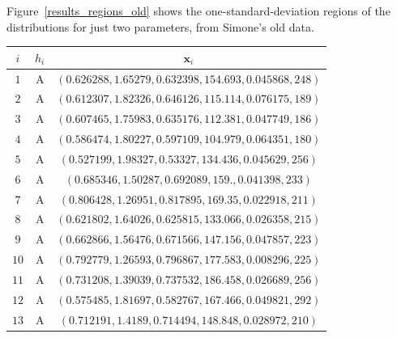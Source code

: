 \documentclass[\ifafour a4paper,12pt,\else a5paper,10pt,\fi%
onecolumn,oneside,article,%
british%
]{memoir}
\theoremstyle{remark}
\theoremstyle{innote}
\renewcommand*{\|}{\mathpunct{|}}
\newcommand*{\yH}{h}
\newcommand*{\yx}{x}
\newcommand*{\yxx}{\bm{\yx}}
\theoremstyle{plain}
\begin{document}
Figure~\ref{results_regions_old} shows the one-standard-deviation regions
of the distributions for just two parameters, from Simone's old data. 
\begin{table}[!h]
  \centering\footnotesize
    \begin{tabular}[t]{@{}c@{\quad}c@{\quad}c@{}}
      $i$ & $\yH_i$ & $\yxx_i$ \\ \midrule
$1$ & A & $(0.626288, 1.65279, 0.632398, 154.693, 0.045868, 248)$ \\
$2$ & A & $(0.612307, 1.82326, 0.646126, 115.114, 0.076175, 189)$ \\
$3$ & A & $(0.607465, 1.75983, 0.635176, 112.381, 0.047749, 186)$ \\
$4$ & A & $(0.586474, 1.80227, 0.597109, 104.979, 0.064351, 180)$ \\
$5$ & A & $(0.527199, 1.98327, 0.53327, 134.436, 0.045629, 256)$ \\
$6$ & A & $(0.685346, 1.50287, 0.692089, 159., 0.041398, 233)$ \\
$7$ & A & $(0.806428, 1.26951, 0.817895, 169.35, 0.022918, 211)$ \\
$8$ & A & $(0.621802, 1.64026, 0.625815, 133.066, 0.026358, 215)$ \\
$9$ & A & $(0.662866, 1.56476, 0.671566, 147.156, 0.047857, 223)$ \\
$10$ & A & $(0.792779, 1.26593, 0.796867, 177.583, 0.008296, 225)$ \\
$11$ & A & $(0.731208, 1.39039, 0.737532, 186.458, 0.026689, 256)$ \\
$12$ & A & $(0.575485, 1.81697, 0.582767, 167.466, 0.049821, 292)$ \\
$13$ & A & $(0.712191, 1.4189, 0.714494, 148.848, 0.028972, 210)$ \\[4\jot]


\end{tabular}
\end{table}
\end{document}
